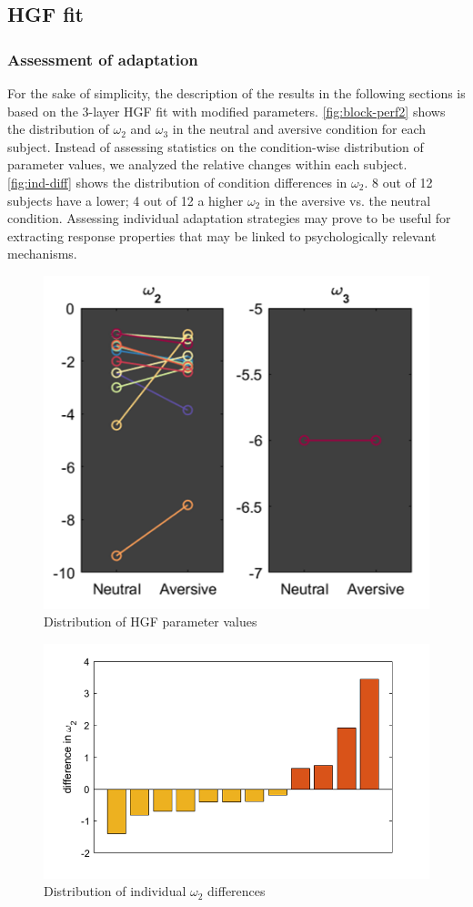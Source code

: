 \documentclass{article}
\begin{document}
\begin{multicols}{2}
\subsection*{HGF fit}
\subsubsection*{Assessment of adaptation}
For the sake of simplicity, the description of the results in the following sections is based on the 3-layer HGF fit with modified parameters. \autoref{fig:block-perf2} shows the distribution of $\omega_2$ and $\omega_3$ in the neutral and aversive condition for each subject. Instead of assessing statistics on the condition-wise distribution of parameter values, we analyzed the relative changes within each subject. \\
\autoref{fig:ind-diff} shows the distribution of condition differences in $\omega_2$. 8 out of 12 subjects have a lower; 4 out of 12 a higher $\omega_2$ in the aversive vs. the neutral condition. Assessing individual adaptation strategies may prove to be useful for extracting response properties that may be linked to psychologically relevant mechanisms. 

\begin{figure}[H]
\centering
\includegraphics[width=.45\textwidth]{param_distr_new.png}
  \caption{Distribution of HGF parameter values}
  \label{fig:block-perf2}
\end{figure}%

\begin{figure}[H]
  \centering
  \includegraphics[width=.5\textwidth]{minus.png}
  \caption{Distribution of individual $\omega_2$ differences}
  \label{fig:ind-diff}
\end{figure}




\end{multicols}
\end{document}
